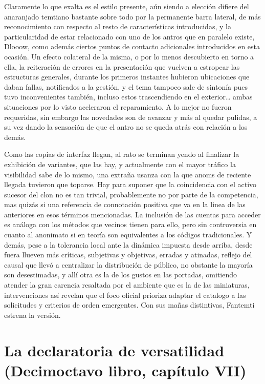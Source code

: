 \documentclass[
]{book}
\begin{document}
Claramente lo que exalta es el estilo presente, aún siendo a elección difiere del anaranjado temtiano bastante sobre todo por la permanente barra lateral, de más reconocimiento con respecto al resto de características introducidas, y la particularidad de estar relacionado con uno de los antros que en paralelo existe, Dlooow, como además ciertos puntos de contacto adicionales introducidos en esta ocasión. Un efecto colateral de la misma, o por lo menos descubierto en torno a ella, la reiteración de errores en la presentación que vuelven a estropear las estructuras generales, durante los primeros instantes hubieron ubicaciones que daban fallas, notificados a la gestión, y el tema tampoco sale de sintonía pues tuvo inconvenientes también, incluso estos trascendiendo en el exterior\ldots{} ambas situaciones por lo visto aceleraron el reparamiento. A lo mejor no fueron requeridas, sin embargo las novedades son de avanzar y más al quedar pulidas, a su vez dando la sensación de que el antro no se queda atrás con relación a los demás.

Como las copias de interfaz llegan, al rato se terminan yendo al finalizar la exhibición de variantes, que las hay, y actualmente con el mayor tráfico la visibilidad sabe de lo mismo, una extraña usanza con la que anoms de reciente llegada tuvieron que toparse. Hay para suponer que la coincidencia con el activo sucesor del clon no es tan trivial, probablemente no por parte de la competencia, mas quizás si una referencia de connotación positiva que va en la linea de las anteriores en esos términos mencionadas. La inclusión de las cuentas para acceder es análoga con los métodos que vecinos tienen para ello, pero sin controversia en cuanto al anonimato si en teoría son equivalentes a los códigos tradicionales. Y demás, pese a la tolerancia local ante la dinámica impuesta desde arriba, desde fuera llueven más críticas, subjetivas y objetivas, erradas y atinadas, reflejo del causal que llevó a centralizar la distribución de público, no obstante la mayoría son desestimadas, y allí otra es la de los gustos en las portadas, omitiendo atender la gran carencia resaltada por el ambiente que es la de las miniaturas, intervenciones así revelan que el foco oficial prioriza adaptar el catalogo a las solicitudes y criterios de orden emergentes. Con sus mañas distintivas, Fantemti estrena la versión.

\hypertarget{la-declaratoria-de-versatilidad-decimoctavo-libro-capuxedtulo-vii}{%
\section{La declaratoria de versatilidad (Decimoctavo libro, capítulo VII)}\label{la-declaratoria-de-versatilidad-decimoctavo-libro-capuxedtulo-vii}}
\end{document}
